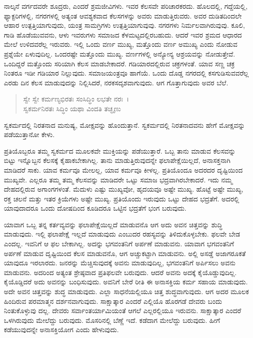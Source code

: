 ನಾಲ್ಕನೆ ವರ್ಗದವರೇ ಶೂದ್ರರು, ಎಂದರೆ ಶ್ರಮಜೀವಿಗಳು. ಇವರ ಕೆಲಸವೇ ಪರಿಚಾರಕರದು. ಹೊಲದಲ್ಲಿ, ಗದ್ದೆಯಲ್ಲಿ, ಫ್ಯಾಕ್ಟರಿಗಳಲ್ಲಿ, ನಗರಗಳಲ್ಲಿ ಅತ್ಯಂತ ಆವಶ್ಯಕವಾದ ಕೆಲಸಗಳನ್ನು ಅವರು ಮಾಡುತ್ತಿರುವರು. ಅವರ ದುಡಿತದಿಂದಲೇ ಆಹಾರ ಉತ್ಪತ್ತಿಯಾಗುವುದು, ಯಂತ್ರ ಸಾಮಗ್ರಿಗಳು ಉತ್ಪತ್ತಿಯಾಗುವುವು. ನಗರಗಳು ನಿರ್ಮಲವಾಗಿರುವುವು. ಕೂಲಿ, ಗಾಡಿ ಹೊಡೆಯುವವನು, ಆಳು ಇವರುಗಳು ಸಮಾಜದ ಕೆಳಮಟ್ಟದಲ್ಲಿರಬಹುದು. ಆದರೆ ಇವರ ಶ್ರಮದ ಆಧಾರದ ಮೇಲೆ ಉಳಿದವರೆಲ್ಲ ಇರುವರು. ಇಲ್ಲಿ ಒಂದು ವರ್ಣ ಮುಖ್ಯ, ಮತ್ತೊಂದು ವರ್ಣ ಅಮುಖ್ಯ ಎಂದು ನೋಡುವ ಪ್ರಶ್ನೆಯೇ ಏಳುವುದಿಲ್ಲ. ಒಂದರಷ್ಟೇ ಮತ್ತೊಂದು ಮುಖ್ಯ. ವರ್ಣಗಳಲ್ಲಿ ಅನ್ಯೋನ್ಯ ಆಶ್ರಯವನ್ನು ನೋಡುತ್ತೇವೆ. ಒಂದಿದ್ದರೆ ಮತ್ತೊಂದು ಸರಿಯಾಗಿ ಕೆಲಸ ಮಾಡಬೇಕಾದರೆ. ಗಡಿಯಾರದಲ್ಲಿರುವ ಚಕ್ರಗಳಂತೆ. ಯಾವ ಸಣ್ಣ ಚಕ್ರ ನಿಂತರೂ ಇಡೀ ಗಡಿಯಾರ ನಿಲ್ಲುವುದು. ಸಮಾಜಯಂತ್ರವೂ ಹಾಗೆಯೆ. ಒಂದು ದೊಡ್ಡ ನಗರದಲ್ಲಿ ಕಸಗುಡಿಸುವವರೆಲ್ಲ ಎರಡು ದಿನ ಕೆಲಸ ಮಾಡುವುದನ್ನು ನಿಲ್ಲಿಸಿದರೆ, ನರಕಸದೃಶವಾಗುವುದು. ಆಗ ಗೊತ್ತಾಗುವುದು ಅವರ ಬೆಲೆ.

\begin{verse}
ಸ್ವೇ ಸ್ವೇ ಕರ್ಮಣ್ಯಭಿರತಃ ಸಂಸಿದ್ಧಿಂ ಲಭತೇ ನರಃ~।\\ಸ್ವಕರ್ಮನಿರತಃ ಸಿದ್ಧಿಂ ಯಥಾ ವಿಂದತಿ ತಚ್ಛೃಣು 
\end{verse}

{\small ಸ್ವಕರ್ಮದಲ್ಲಿ ನಿರತನಾದ ಮನುಷ್ಯ, ಮೋಕ್ಷವನ್ನು ಹೊಂದುತ್ತಾನೆ. ಸ್ವಕರ್ಮದಲ್ಲಿ ನಿರತನಾದವನು ಹೇಗೆ ಮೋಕ್ಷವನ್ನು ಪಡೆಯುತ್ತಾನೋ ಕೇಳು.}

ಪ್ರತಿಯೊಬ್ಬರೂ ತಮ್ಮ ಸ್ವಕರ್ಮದ ಮೂಲಕವೇ ಮುಕ್ತಿಯನ್ನು ಪಡೆಯುತ್ತಾರೆ. ಒಬ್ಬ ತಾನು ಮಾಡುವ ಕೆಲಸವನ್ನು ಬಿಟ್ಟು ಇನ್ನೊಬ್ಬನ ಕೆಲಸಕ್ಕೆ ಕೈಹಾಕಬೇಕಾಗಿಲ್ಲ. ತಾನು ಮಾಡುತ್ತಿರುವುದನ್ನೇ ಫಲಾಪೇಕ್ಷೆಯಿಲ್ಲದೆ, ಅನಾಸಕ್ತನಾಗಿ ಮಾಡಿದರೆ ಸಾಕು. ಯಾವ ಕರ್ಮವೂ ಮೇಲಲ್ಲ, ಯಾವ ಕರ್ಮವೂ ಕೀಳಲ್ಲ. ಪ್ರತಿಯೊಂದೂ ಅದರದರ ದೃಷ್ಟಿಯಿಂದ ಮುಖ್ಯವೇ. ಎಲ್ಲರೂ ತಮ್ಮ ತಮ್ಮ ಕೆಲಸವನ್ನು ಮಾಡಿದರೇ ಒಟ್ಟು ಸಮಾಜ ಭದ್ರವಾಗಿರಬೇಕಾದರೆ. ಇದು ನಮ್ಮ ದೇಹದಲ್ಲಿರುವ ಅಗಾಂಗಗಳಂತೆ. ಮೆದುಳು ಎಷ್ಟು ಮುಖ್ಯವೋ, ಹೃದಯವೂ ಅಷ್ಟೇ ಮುಖ್ಯ. ಹೊಟ್ಟೆ ಅಷ್ಟೇ ಮುಖ್ಯ, ರಕ್ತ ಚಲನೆ ಮತ್ತು ಇತರ ಕ್ರಿಯೆಗಳು ಅಷ್ಟೇ ಮುಖ್ಯ. ಪ್ರತಿಯೊಂದು ಇರುವುದು ಒಟ್ಟು ದೇಹದ ಭದ್ರತೆಗೆ. ಅದರಲ್ಲಿ ಯಾವುದಾದರೂ ಒಂದು ದೋಷದಿಂದ ಕೂಡಿದರೂ ಒಟ್ಟಿನ ಭದ್ರತೆಗೆ ಭಂಗ ಬರುವುದು.

ಯಾವಾಗ ಒಬ್ಬ ತನ್ನ ಕರ್ತವ್ಯವನ್ನು ಫಲಾಪೇಕ್ಷೆಯಿಲ್ಲದೆ ಮಾಡುವನೊ ಆಗ ಅದು ಅವನ ಚಿತ್ತವನ್ನು ಶುದ್ಧಿ ಮಾಡುವುದು. ಇಲ್ಲಿ ಫಲಾಪೇಕ್ಷೆ ಇಲ್ಲದೆ ಮಾಡುವುದು ಎಂಬುದರ ರಹಸ್ಯವನ್ನು ತಿಳಿದುಕೊಳ್ಳಬೇಕು. ಫಲವೇ ಬೇಡ ಎಂದಲ್ಲ. ಇವನಿಗೆ ಆ ಫಲ ಬೇಕಾಗಿಲ್ಲ. ಅದನ್ನು ಭಗವಂತನಿಗೆ ಅರ್ಪಣೆ ಮಾಡುವನು. ಯಾವಾಗ ಭಗವಂತನಿಗೆ ಅರ್ಪಣೆ ಮಾಡುವ ದೃಷ್ಟಿಯಿಂದ ಕೆಲಸ ಮಾಡುವನೊ, ಆಗ ಅಚ್ಚುಕಟ್ಟಾಗಿ ಮಾಡುವನು. ಅಲ್ಲಿ ಅಸಡ್ಡೆ ಅಜಾಗರೂಕತೆ ಯಾವುದೂ ಇರಲಾರದು. ಜನರನ್ನು ಮೆಚ್ಚಿಸುವುದಕ್ಕೆ ಅವನು ಮಾಡುವುದಿಲ್ಲ, ಭಗವಂತನಿಗೆ ಅರ್ಪಿಸಲು ಅವನು ಮಾಡುವನು. ಅದರಿಂದ ಅತ್ಯಂತ ಶ್ರೇಷ್ಠವಾದ ಪ್ರತಿಫಲವೇ ಬರುವುದು. ಆದರೆ ಅವನು ಅದಕ್ಕೆ ಕೈಯೊಡ್ಡುವುದಿಲ್ಲ. ಕೈಯೊಡ್ಡಿದರೆ ಅದು ಅವನನ್ನು ಬಂಧಿಸುವುದು. ಅವನಿಗೆ ಬೇರೆ ರೀತಿ ಈ ಅನಾಸಕ್ತಿಯ ಕರ್ಮ ಸಹಾಯ ಮಾಡುವುದು. ಅದೇ ಅವನ ಚಿತ್ತವನ್ನು ಶುದ್ಧ ಮಾಡುವುದು. ಎಲ್ಲಾ ಸಾಧನೆಯಲ್ಲಿಯೂ ಚಿತ್ತ ಶುದ್ಧವಾಗುವುದು. ಆಗ ಅದರ ಮೂಲಕ ಹಿಂದಿರುವ ಪರಮಾತ್ಮನ ದರ್ಶನವಾಗುವುದು. ಸಾಕ್ಷಾತ್ಕಾರ ಎಂದರೆ ಎಲ್ಲಿಯೊ ಹೊರಗಡೆ ದೇವರು ಬಂದು ನಿಂತುಕೊಳ್ಳುವು ದಲ್ಲ. ದೇವರು ಸರ್ವಾಂತರ್ಯಾಮಿಯಂತೆ ಆಗಲೆ ಎಲ್ಲರಲ್ಲಿಯೂ ಇರುವನು. ಸಾಕ್ಷಾತ್ಕಾರ ಎಂದರೆ ಒಳಗಿರುವುದು ಮೇಲೆದ್ದು ಬರುವುದು. ಮೊಸರಿನಲ್ಲಿ ಬೆಣ್ಣೆ ಇದೆ. ಕಡೆದಾಗ ಮೇಲೆದ್ದು ಬರುವುದು. ಹೀಗೆ ಕಡೆಯುವುದನ್ನೇ ಅನಾಸಕ್ತಿಯೋಗ ಎಂದು ಹೇಳುವುದು.

